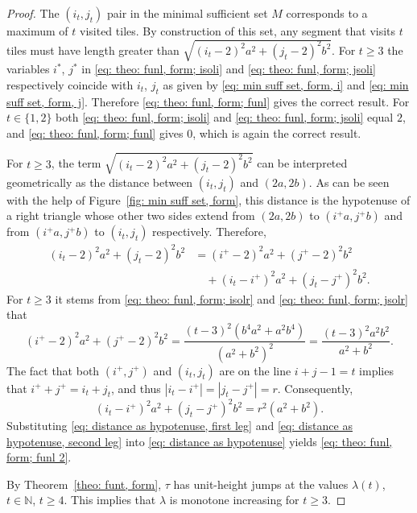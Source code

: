 \documentclass[12pt, a4paper]{article}
\newcommand{\funt}{\tau} %
\newcommand{\funl}{\lambda} %
\newcommand{\tiles}{t} %
\newcommand{\isolr}{i^+}
\newcommand{\jsolr}{j^+}
\newcommand{\isoli}{i^\ast}
\newcommand{\jsoli}{j^\ast}
\newcommand{\roundterm}{r}
\newcommand{\mss}{M}
\begin{document}
\begin{proof}
The $(i_\tiles,j_\tiles)$ pair in the minimal sufficient set $\mss$ corresponds to a maximum of $\tiles$ visited tiles. By construction of this set, any segment that visits $\tiles$ tiles must have length greater than $\sqrt{(i_\tiles-2)^2a^2 + (j_\tiles-2)^2b^2}$. For $\tiles \geq 3$ the variables $\isoli$, $\jsoli$ in \eqref{eq: theo: funl, form; isoli} and \eqref{eq: theo: funl, form; jsoli} respectively coincide with $i_\tiles$, $j_\tiles$ as given by \eqref{eq: min suff set, form, i} and \eqref{eq: min suff set, form, j}. Therefore \eqref{eq: theo: funl, form; funl} gives the correct result. For $\tiles \in \{1, 2\}$ both \eqref{eq: theo: funl, form; isoli} and \eqref{eq: theo: funl, form; jsoli} equal $2$, and \eqref{eq: theo: funl, form; funl} gives $0$, which is again the correct result.

For $\tiles \geq 3$, the term $\sqrt{(i_\tiles-2)^2a^2 + (j_\tiles-2)^2b^2}$ can be interpreted geometrically as the distance between $(i_\tiles, j_\tiles)$ and $(2a, 2b)$. As can be seen with the help of Figure~\ref{fig: min suff set, form}, this distance is the hypotenuse of a right triangle whose other two sides extend from $(2a, 2b)$ to $(\isolr a, \jsolr b)$ and from $(\isolr a, \jsolr b)$ to $(i_\tiles, j_\tiles)$ respectively. Therefore,
\begin{equation}
\label{eq: distance as hypotenuse}
\begin{split}
(i_\tiles-2)^2a^2 + (j_\tiles-2)^2b^2 &= (\isolr-2)^2a^2 + (\jsolr-2)^2b^2 \\
&\quad + (i_\tiles-\isolr)^2a^2 + (j_\tiles-\jsolr)^2b^2.
\end{split}
\end{equation}
For $\tiles \geq 3$ it stems from \eqref{eq: theo: funl, form; isolr}
and \eqref{eq: theo: funl, form; jsolr} that
\begin{equation}
\label{eq: distance as hypotenuse, first leg}
(\isolr-2)^2a^2 + (\jsolr-2)^2b^2 =
\frac{(\tiles-3)^2 (b^4a^2+a^2b^4)}{(a^2+b^2)^2} =
\frac{(\tiles-3)^2 a^2b^2}{a^2+b^2}.
\end{equation}
The fact that both $(\isolr, \jsolr)$ and $(i_\tiles, j_\tiles)$ are on the line $i+j-1=\tiles$ implies that $\isolr+\jsolr = i_\tiles+ j_\tiles$, and thus $|i_\tiles-\isolr| = |j_\tiles-\jsolr| = \roundterm$. Consequently,
\begin{equation}
\label{eq: distance as hypotenuse, second leg}
(i_\tiles-\isolr)^2a^2 + (j_\tiles-\jsolr)^2b^2 = \roundterm^2 (a^2+b^2).
\end{equation}
Substituting \eqref{eq: distance as hypotenuse, first leg} and \eqref{eq: distance as hypotenuse, second leg} into \eqref{eq: distance as hypotenuse} yields \eqref{eq: theo: funl, form; funl 2}.

By Theorem~\ref{theo: funt, form}, $\funt$ has unit-height jumps at the values $\funl(\tiles)$, $\tiles \in \mathbb N$, $\tiles \geq 4$. This implies that $\funl$ is monotone increasing for $\tiles \geq 3$.
\end{proof}
\end{document}

